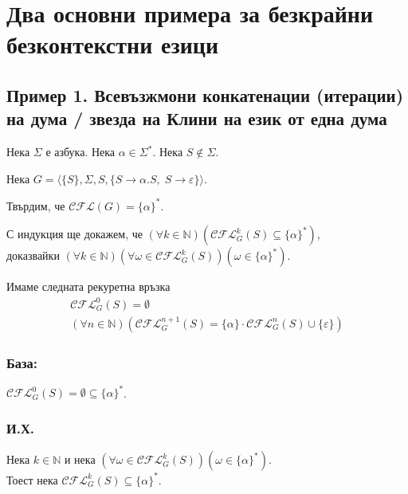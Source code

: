 \documentclass[12pt]{article}
\begin{document}
\section*{Два основни примера за безкрайни безконтекстни езици}

\subsection*{Пример 1. Всевъзжмони конкатенации (итерации) на дума / звезда на Клини на език от една дума}

Нека \(\Sigma\) е азбука. Нека \(\alpha \in \Sigma^*\). Нека \(S \notin \Sigma\).

Нека \(G = \langle \{S\}, \Sigma,  S, \{S \to \alpha.S,\; S \to \varepsilon\} \rangle\).

Твърдим, че \(\mathcal{CFL}(G) = \{\alpha\}^*\).

\vspace*{5mm}

\par С индукция ще докажем, че \((\forall k \in \mathbb N)(\mathcal{CFL}_G^k(S) \subseteq \{\alpha\}^*  )\), \\
доказвайки \((\forall k \in \mathbb N)(\forall \omega \in \mathcal{CFL}_G^k(S))(\omega \in \{\alpha\}^*  )\).

\vspace*{5mm}

\par Имаме следната рекуретна връзка
\begin{align*}
    \mathcal{CFL}_G^0(S) = \emptyset \\
    (\forall n \in \mathbb N)(\mathcal{CFL}_G^{n + 1}(S) = \{\alpha\} \cdot \mathcal{CFL}_G^n(S) \cup \{\varepsilon\})
\end{align*}

\subsubsection*{База:}
\(\mathcal{CFL}_G^0(S) = \emptyset \subseteq \{\alpha\}^*\).

\subsubsection*{И.Х.}
Нека \(k \in \mathbb N\) и нека \((\forall \omega \in \mathcal{CFL}_G^k(S))(\omega \in \{\alpha\}^*  )\). \\
Тоест нека \(\mathcal{CFL}_G^k(S) \subseteq \{\alpha\}^*\).
\end{document}
